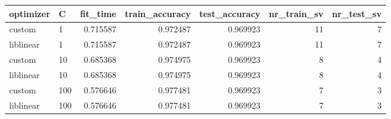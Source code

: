 \begin{tabular}{llrrrrr}
\toprule
optimizer &   C &  fit\_time &  train\_accuracy &  test\_accuracy &  nr\_train\_sv &  nr\_test\_sv \\
\midrule
   custom &   1 &  0.715587 &        0.972487 &       0.969923 &           11 &           7 \\
liblinear &   1 &  0.715587 &        0.972487 &       0.969923 &           11 &           7 \\
   custom &  10 &  0.685368 &        0.974975 &       0.969923 &            8 &           4 \\
liblinear &  10 &  0.685368 &        0.974975 &       0.969923 &            8 &           4 \\
   custom & 100 &  0.576646 &        0.977481 &       0.969923 &            7 &           3 \\
liblinear & 100 &  0.576646 &        0.977481 &       0.969923 &            7 &           3 \\
\bottomrule
\end{tabular}
